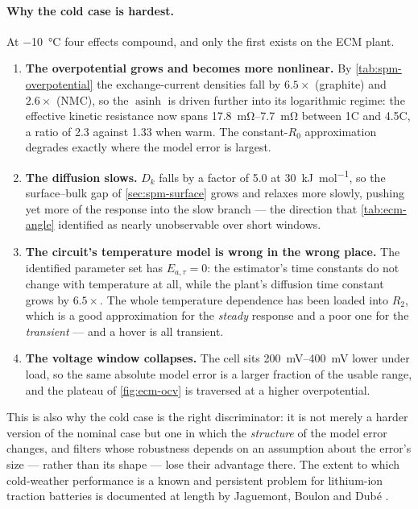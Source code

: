 \paragraph{Why the cold case is hardest.} At \SI{-10}{\celsius} four effects compound, and only
the first exists on the ECM plant.
\begin{enumerate}[nosep,leftmargin=*]
\item \textbf{The overpotential grows and becomes more nonlinear.} By
  \cref{tab:spm-overpotential} the exchange-current densities fall by $6.5\times$ (graphite) and
  $2.6\times$ (NMC), so the $\operatorname{asinh}$ is driven further into its logarithmic regime:
  the effective kinetic resistance now spans \SIrange{17.8}{7.7}{\milli\ohm} between 1C and 4.5C,
  a ratio of \num{2.3} against \num{1.33} when warm. The constant-$R_0$ approximation degrades
  exactly where the model error is largest.
\item \textbf{The diffusion slows.} $D_k$ falls by a factor of \num{5.0} at
  \SI{30}{\kilo\joule\per\mole}, so the surface--bulk gap of \cref{sec:spm-surface} grows and
  relaxes more slowly, pushing yet more of the response into the slow branch --- the direction
  that \cref{tab:ecm-angle} identified as nearly unobservable over short windows.
\item \textbf{The circuit's temperature model is wrong in the wrong place.} The identified
  parameter set has $E_{a,\tau}=0$: the estimator's time constants do not change with
  temperature at all, while the plant's diffusion time constant grows by $6.5\times$. The whole
  temperature dependence has been loaded into $R_2$, which is a good approximation for the
  \emph{steady} response and a poor one for the \emph{transient} --- and a hover is all transient.
\item \textbf{The voltage window collapses.} The cell sits \SIrange{200}{400}{\milli\volt} lower
  under load, so the same absolute model error is a larger fraction of the usable range, and the
  plateau of \cref{fig:ecm-ocv} is traversed at a higher overpotential.
\end{enumerate}
This is also why the cold case is the right discriminator: it is not merely a harder version of
the nominal case but one in which the \emph{structure} of the model error changes, and filters
whose robustness depends on an assumption about the error's size --- rather than its shape ---
lose their advantage there. The extent to which cold-weather performance is a known and
persistent problem for lithium-ion traction batteries is documented at length by Jaguemont,
Boulon and Dub\'e \cite{jaguemont2016cold}.

